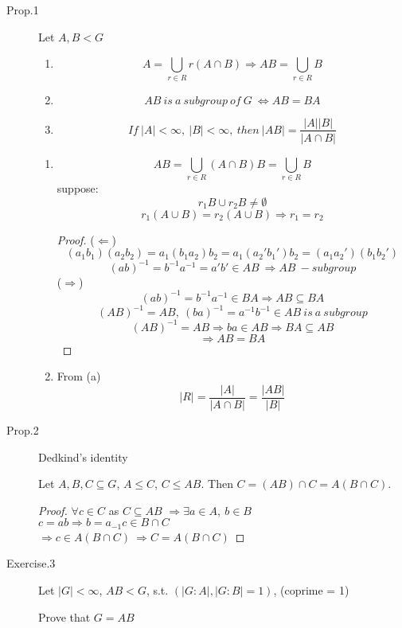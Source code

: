 \documentclass[12pt, a4paper]{article}
\theoremstyle{definition}
\begin{document}
\begin{description}
    \item[Prop.1] Let $A, B < G$
    \begin{enumerate}[label= (\alph*)]
        \item \[A = \bigcup_{r\in R}r(A\cap B) \Rightarrow AB =\bigcup_{r\in R}B \]
        \item \[AB\ is\ a\ subgroup\ of\ G\ \Leftrightarrow AB = BA \]
        \item \[If\ |A|< \infty ,\ |B|< \infty ,\ then\ |AB|=\frac{|A||B|}{|A\cap B|} \]
    \end{enumerate}
    \begin{enumerate}[label= (\alph*)]
        \item 
            \[ AB = \bigcup_{r\in R}(A\cap B)B= \bigcup_{r\in R}B\]
            suppose: \[r_1B\cup r_2B \neq \emptyset \] 
            \[r_1(A\cup B)=r_2(A\cup B) \Rightarrow r_1=r_2\]
        \begin{proof}
            ($\Leftarrow$) 
            \[(a_1b_1)(a_2b_2) = a_1(b_1a_2)b_2 = a_1(a_2'b_1')b_2 = (a_1a_2')(b_1b_2') \]
            \[{(ab)}^{-1} = b^{-1}a^{-1}=a'b' \in AB\ \Rightarrow AB\ -subgroup \]
            ($\Rightarrow$)
            \[{(ab)}^{-1}=b^{-1}a^{-1}\in BA \Rightarrow AB\subseteq BA \]
            \[{(AB)}^{-1} = AB,\ {(ba)}^{-1}=a^{-1}b^{-1}\in AB\ is\ a\ subgroup \]
            \[{(AB)}^{-1} = AB \Rightarrow ba\in AB \Rightarrow BA\subseteq AB\]
            \[\Rightarrow  AB = BA \] 
        \end{proof}
        \item From (a) \[ |R| =\frac{|A|}{|A\cap B|} =\frac{|AB|}{|B|} \] 
    \end{enumerate}
    \item[Prop.2]Dedkind's identity
    \par
    Let $A, B, C \subseteq G $, $ A\leqslant C $, $ C \leqslant AB $. Then $C = (AB)
    \cap C = A(B\cap C)$.\par
    \begin{proof}
        $\forall c\in C $ as $ C\subseteq AB$ $\Rightarrow \exists a\in A,\ b\in B$\\
        $c=ab\Rightarrow b= a_{-1}c\in B\cap C$\\
        $\Rightarrow c\in A(B\cap C)\ \Rightarrow C = A(B\cap C) $
        \par
    \end{proof}
    \item[Exercise.3]
    \par
    Let $|G|<\infty $, $AB<G$, s.t. $(|G:A|, |G:B|=1) $, (coprime = 1)
    \par
    Prove that $G = AB$
\end{description}
\end{document}
